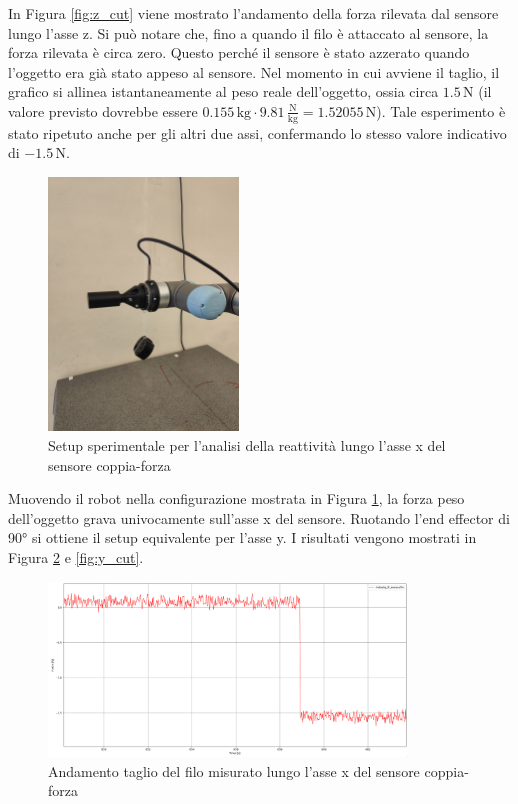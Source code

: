 In Figura \ref{fig:z_cut} viene mostrato l'andamento della forza rilevata dal sensore lungo l'asse z. 
Si pu\`{o} notare che, fino a quando il filo \`{e} attaccato al sensore, la forza rilevata \`{e} circa zero. 
Questo perch\'{e} il sensore \`{e} stato azzerato quando l'oggetto era gi\`{a} stato appeso al sensore. 
Nel momento in cui avviene il taglio, il grafico si allinea istantaneamente al peso reale dell'oggetto, 
ossia circa $1.5 \, \text{N}$ (il valore previsto dovrebbe essere $0.155 \, \text{kg} \cdot 9.81 \, \frac{\text{N}}{\text{kg}} = 1.52055 \, \text{N}$).
Tale esperimento \`{e} stato ripetuto anche per gli altri due assi, confermando lo stesso valore indicativo di $-1.5 \, \text{N}$.
\begin{figure}[H]
    \centering
    \includegraphics*[width=0.45\textwidth]{images/setup_x.jpg}
    \caption{Setup sperimentale per l'analisi della reattivit\`{a} lungo l'asse x del sensore coppia-forza}
    \label{fig:setup_x}
\end{figure}
Muovendo il robot nella configurazione mostrata in Figura \ref{fig:setup_x}, la forza peso dell'oggetto grava univocamente sull'asse x 
del sensore. 
Ruotando l'end effector di 90° si ottiene il setup equivalente per l'asse y.
I risultati vengono mostrati in Figura \ref{fig:x_cut} e \ref{fig:y_cut}.
\newpage 
\begin{figure}[H]
    \centering
    \includegraphics*[width=0.85\textwidth]{images/x_cut.png}
    \caption{Andamento taglio del filo misurato lungo l'asse x del sensore coppia-forza}
    \label{fig:x_cut}
\end{figure}
